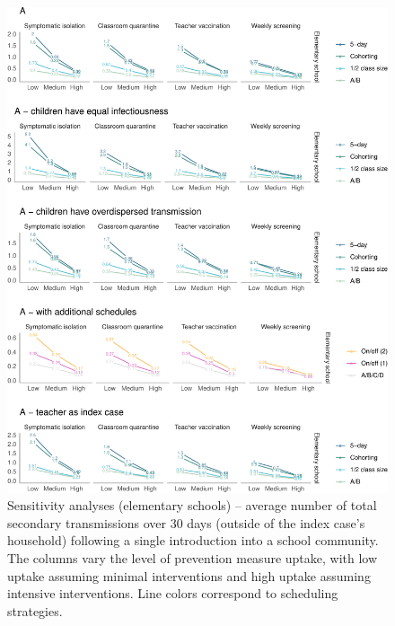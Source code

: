 \documentclass[
]{article}
\begin{document}
\begin{figure}
\centering
\includegraphics{Schools_supplement_files/figure-latex/figs3-1.pdf}
\caption{Sensitivity analyses (elementary schools) -- average number of
total secondary transmissions over 30 days (outside of the index case's
household) following a single introduction into a school community. The
columns vary the level of prevention measure uptake, with low uptake
assuming minimal interventions and high uptake assuming intensive
interventions. Line colors correspond to scheduling strategies.}
\end{figure}
\end{document}
